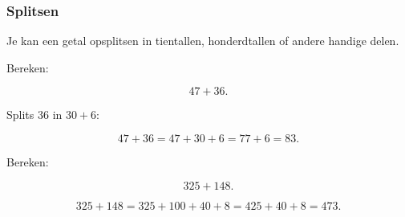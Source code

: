 \documentclass{ximera}
\begin{document}




\subsubsection*{Splitsen}

Je kan een getal opsplitsen in tientallen, honderdtallen of andere handige
delen.

\begin{voorbeeld}

Bereken:

\[
47+36.
\]

Splits \(36\) in \(30+6\):

\[
47+36
=
47+30+6
=
77+6
=
83.
\]

\end{voorbeeld}


\begin{voorbeeld}

Bereken:

\[
325+148.
\]

\[
325+148
=
325+100+40+8
=
425+40+8
=
473.
\]

\end{voorbeeld}
\end{document}
